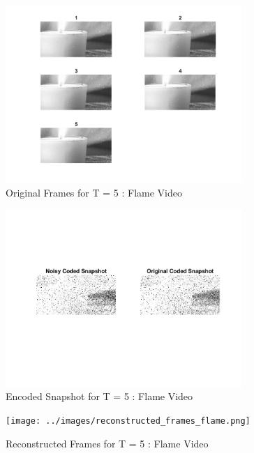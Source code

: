 \documentclass[a4paper,12pt]{article}
\begin{document}
\begin{figure}[htbp]
  \centering
  \includegraphics[width=0.8\textwidth]{../images/original_frames_flame.png}
  \caption{Original Frames for T = 5 : Flame Video}
  \label{fig:output}
\end{figure}

\begin{figure}[htbp]
  \centering
  \includegraphics[width=0.8\textwidth]{../images/noisy_coded_snapshot_flame.png}
  \caption{Encoded Snapshot for T = 5 : Flame Video}
  \label{fig:output}
\end{figure}

\begin{figure}[htbp]
  \centering
  \texttt{[image: ../images/reconstructed\_frames\_flame.png]}
  \caption{Reconstructed Frames for T = 5 : Flame Video}
  \label{fig:output}
\end{figure}
\end{document}
